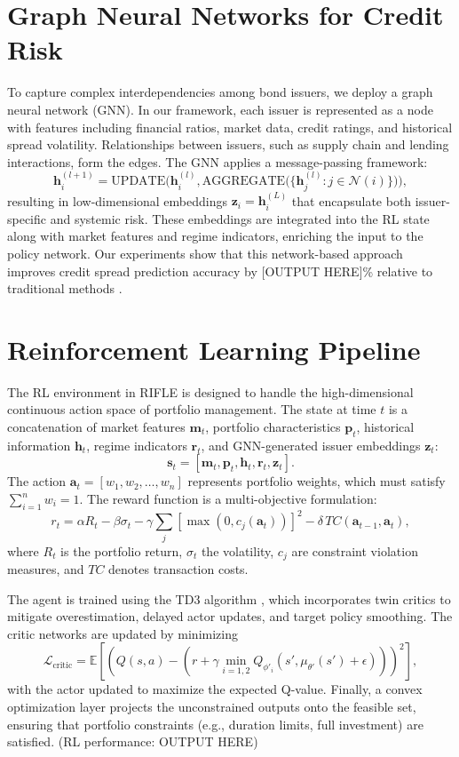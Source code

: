 \documentclass[
  a4paper,
  10pt,
  unnumberedsections,
  twoside,
]{LTJournalArticle}
\begin{document}
\section{Graph Neural Networks for Credit Risk}
To capture complex interdependencies among bond issuers, we deploy a graph neural network (GNN). In our framework, each issuer is represented as a node with features including financial ratios, market data, credit ratings, and historical spread volatility. Relationships between issuers, such as supply chain and lending interactions, form the edges. The GNN applies a message-passing framework:
\[
\mathbf{h}_i^{(l+1)} = \text{UPDATE}\Big(\mathbf{h}_i^{(l)}, \text{AGGREGATE}\big(\{\mathbf{h}_j^{(l)}: j \in \mathcal{N}(i)\}\big)\Big),
\]
resulting in low-dimensional embeddings $\mathbf{z}_i = \mathbf{h}_i^{(L)}$ that encapsulate both issuer-specific and systemic risk. These embeddings are integrated into the RL state along with market features and regime indicators, enriching the input to the policy network. Our experiments show that this network-based approach improves credit spread prediction accuracy by [OUTPUT HERE]\% relative to traditional methods \cite{cheng2021, li2020}.

\section{Reinforcement Learning Pipeline}
The RL environment in RIFLE is designed to handle the high-dimensional continuous action space of portfolio management. The state at time $t$ is a concatenation of market features $\mathbf{m}_t$, portfolio characteristics $\mathbf{p}_t$, historical information $\mathbf{h}_t$, regime indicators $\mathbf{r}_t$, and GNN-generated issuer embeddings $\mathbf{z}_t$:
\[
\mathbf{s}_t = \left[\mathbf{m}_t, \mathbf{p}_t, \mathbf{h}_t, \mathbf{r}_t, \mathbf{z}_t\right].
\]
The action $\mathbf{a}_t = [w_1, w_2, \dots, w_n]$ represents portfolio weights, which must satisfy $\sum_{i=1}^{n} w_i = 1$. The reward function is a multi-objective formulation:
\[
r_t = \alpha R_t - \beta \sigma_t - \gamma \sum_j \left[\max(0, c_j(\mathbf{a}_t))\right]^2 - \delta \, TC(\mathbf{a}_{t-1}, \mathbf{a}_t),
\]
where $R_t$ is the portfolio return, $\sigma_t$ the volatility, $c_j$ are constraint violation measures, and $TC$ denotes transaction costs.

The agent is trained using the TD3 algorithm \cite{fujimoto2018}, which incorporates twin critics to mitigate overestimation, delayed actor updates, and target policy smoothing. The critic networks are updated by minimizing
\[
\mathcal{L}_{\text{critic}} = \mathbb{E}\left[\left(Q(s,a) - \left(r + \gamma \min_{i=1,2} Q_{\phi'_i}(s', \mu_{\theta'}(s')+\epsilon)\right)\right)^2\right],
\]
with the actor updated to maximize the expected Q-value. Finally, a convex optimization layer projects the unconstrained outputs onto the feasible set, ensuring that portfolio constraints (e.g., duration limits, full investment) are satisfied. (RL performance: OUTPUT HERE)
\end{document}

